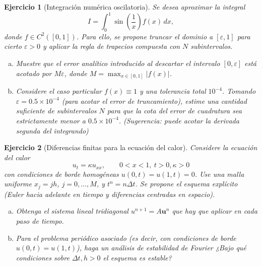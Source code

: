 \documentclass[12pt]{article}%
\newtheorem{exercise}{Ejercicio}
\begin{document}
\begin{exercise}[Integración numérica oscilatoria]
Se desea aproximar la integral
\[
I=\int_0^1 \sin\!\left(\frac{1}{x}\right)f(x)\,dx,
\]
donde $f\in C^2([0,1])$. Para ello, se propone truncar el dominio a $[\varepsilon,1]$ para cierto $\varepsilon>0$ y aplicar la regla de trapecios compuesta con $N$ subintervalos.

\begin{enumerate}[(a)]
    \item Muestre que el error analítico introducido al descartar el intervalo $[0,\varepsilon]$ está acotado por $M\varepsilon$, donde $M=\max_{x\in[0,1]} |f(x)|$. 
    \item Considere el caso particular $f(x)\equiv 1$ y una tolerancia total $10^{-4}$. Tomando $\varepsilon = 0.5 \times 10^{-4}$ (para acotar el error de truncamiento), estime una cantidad suficiente de subintervalos $N$ para que la cota del error de cuadratura sea estrictamente menor a $0.5 \times 10^{-4}$. (Sugerencia: puede acotar la derivada segunda del integrando)
\end{enumerate}
\end{exercise}


\begin{exercise}[Diferencias finitas para la ecuación del calor]
Considere la ecuación del calor
\[
u_t= \kappa u_{xx}, \qquad 0<x<1,\ t>0,  \kappa>0
\]
con condiciones de borde homog\'eneas $u(0,t)=u(1,t)=0$. Use una malla uniforme $x_j=jh$, $j=0,\dots,M$, y $t^n=n\Delta t$. Se propone el esquema explícito (Euler hacia adelante en tiempo y diferencias centradas en espacio).
\begin{enumerate}[(a)]
\item Obtenga el sistema lineal tridiagonal $u^{n+1}= A\mathbf u^n$ que hay que aplicar en cada paso de tiempo.
\item Para el problema peri\'odico asociado (es decir, con condiciones de borde $u(0,t)=u(1,t)$), haga un an\'alisis de estabilidad de Fourier ¿Bajo qué condiciones sobre $\Delta t,h>0$ el esquema es estable?
\end{enumerate}
\end{exercise}
\end{document}
